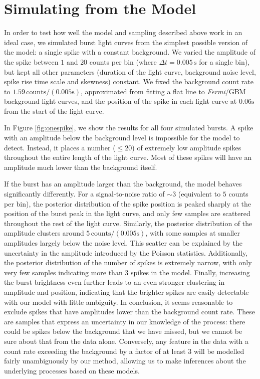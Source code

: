 \documentclass[12pt]{emulateapj}
\newcommand{\project}[1]{\textsl{#1}}
\newcommand{\fermi}{\project{Fermi}}
\begin{document}
\section{Simulating from the Model}
\label{ch6:modelsims}

In order to test how well the model and sampling described above work in an ideal case, we simulated burst light curves from the simplest possible version
of the model: a single spike with a constant background. We varied the amplitude of the spike between $1$ and $20$ counts per bin (where $\Delta t = 0.005\,\mathrm{s}$ for
a single bin), but kept all other parameters (duration of the light curve, background noise level, spike rise time scale and skewness) constant. 
We fixed the background count rate to $1.59\,\mathrm{counts}/(0.005\mathrm{s})$, approximated from fitting a flat line to \fermi/GBM background light curves, and the position
of the spike in each light curve at $0.06\mathrm{s}$ from the start of the light curve.

In Figure \ref{fig:onespike}, we show the results for all four simulated bursts. A spike with an amplitude below the background level is impossible for the model
to detect. Instead, it places a number ($\leq 20$) of extremely low amplitude spikes throughout the entire length of the light curve. Most of these spikes will have an amplitude
much lower than the background itself. 

If the burst has an amplitude larger than the background, the model behaves significantly differently. For a signal-to-noise ratio of $\sim 3$ (equivalent to $5$ counts per bin), 
the posterior distribution of the spike position is peaked sharply at the position of the burst peak in the light curve, 
and only few samples are scattered throughout the rest of the light curve. Similarly, the posterior distribution of the amplitude clusters 
around $5 \,\mathrm{counts}/(0.005\mathrm{s})$, with some samples at 
smaller amplitudes largely below the noise level. This scatter can be explained by the uncertainty in the amplitude introduced by the Poisson statistics. 
Additionally, the posterior distribution of the
number of spikes is extremely narrow, with only very few samples indicating more than $3$ spikes in the model. 
Finally, increasing the burst brightness even further leads to an even stronger clustering in amplitude and position, indicating that the brighter spikes are easily detectable with our model 
with little ambiguity. 
In conclusion, it seems reasonable to exclude spikes that have amplitudes lower than the background count rate. These are samples that express an uncertainty in our knowledge of 
the process: there could be spikes below the background that we have missed, but we cannot be sure about that from the data alone. Conversely, any feature in the data with a count
rate exceeding the background by a factor of at least $3$ will be modelled fairly unambiguously by our method, allowing us to make inferences about the underlying processes based on
these models.
\end{document}
